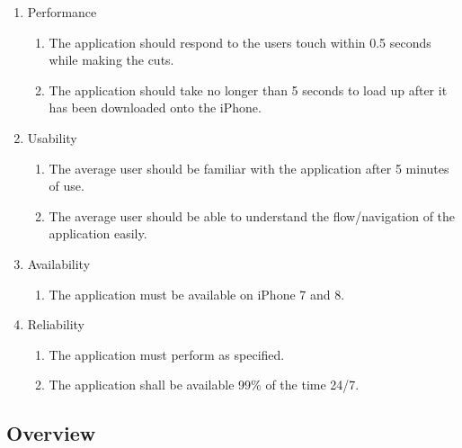 \documentclass[11pt]{article}
\begin{document}
    \begin{enumerate}
        \item Performance
            \begin{enumerate}[label*=\arabic*.]
            \item The application should respond to the users touch within 0.5 seconds while making the cuts.
            \item The application should take no longer than 5 seconds to load up after it has been downloaded onto the iPhone.
            \end{enumerate}
            
        \item Usability
            \begin{enumerate}[label*=\arabic*.]
            \item The average user should be familiar with the application after 5 minutes of use. 
            \item The average user should be able to understand the flow/navigation of the application easily.
            \end{enumerate}
            
        \item Availability
            \begin{enumerate}[label*=\arabic*.]
            \item The application must be available on iPhone 7 and 8.
            \end{enumerate}
            
        \item Reliability
            \begin{enumerate}[label*=\arabic*.]
            \item The application must perform as specified.
            \item The application shall be available 99\% of the time 24/7.
            \end{enumerate}
         
    \end{enumerate}
    \clearpage
    
    \subsection{Overview}
\end{document}
